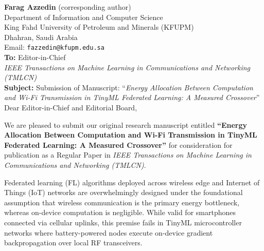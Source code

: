 \documentclass[11pt,a4paper]{article}
\begin{document}
\noindent
\textbf{Farag Azzedin} (corresponding author) \\
Department of Information and Computer Science \\
King Fahd University of Petroleum and Minerals (KFUPM) \\
Dhahran, Saudi Arabia \\
Email: \texttt{fazzedin@kfupm.edu.sa} \\[1.5em]

\noindent
\textbf{To:} Editor-in-Chief \\
\textit{IEEE Transactions on Machine Learning in Communications and Networking (TMLCN)} \\[1.5em]

\noindent
\textbf{Subject:} Submission of Manuscript: ``\textit{Energy Allocation Between Computation and Wi-Fi Transmission in TinyML Federated Learning: A Measured Crossover}'' \\[1em]

\noindent
Dear Editor-in-Chief and Editorial Board,

\vspace{0.5em}
\noindent
We are pleased to submit our original research manuscript entitled \textbf{``Energy Allocation Between Computation and Wi-Fi Transmission in TinyML Federated Learning: A Measured Crossover''} for consideration for publication as a Regular Paper in \textit{IEEE Transactions on Machine Learning in Communications and Networking (TMLCN)}.

\vspace{0.5em}
\noindent
Federated learning (FL) algorithms deployed across wireless edge and Internet of Things (IoT) networks are overwhelmingly designed under the foundational assumption that wireless communication is the primary energy bottleneck, whereas on-device computation is negligible. While valid for smartphones connected via cellular uplinks, this premise fails in TinyML microcontroller networks where battery-powered nodes execute on-device gradient backpropagation over local RF transceivers.
\end{document}
